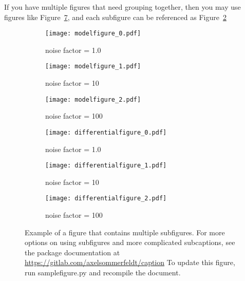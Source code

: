 \documentclass[a4paper,12pt]{article}
\begin{document}
If you have multiple figures that need grouping together, then you may use figures like Figure~\ref{fig:subcaptionfigure}, and each subfigure can be referenced as Figure~\ref{fig:1b}

\begin{figure}
	\begin{subfigure}[b]{.33\textwidth}
		\centering\texttt{[image: modelfigure\_0.pdf]}
		\caption{noise factor = 1.0}\label{fig:1a}
	\end{subfigure}\hfill
	\begin{subfigure}[b]{.33\textwidth}
		\centering\texttt{[image: modelfigure\_1.pdf]}
		\caption{noise factor = 10}\label{fig:1b}
	\end{subfigure}\hfill
	\begin{subfigure}[b]{.33\textwidth}
		\centering\texttt{[image: modelfigure\_2.pdf]}
		\caption{noise factor = 100}\label{fig:1c}
	\end{subfigure}\hfill
	\begin{subfigure}[b]{.33\textwidth}
		\centering\texttt{[image: differentialfigure\_0.pdf]}
		\caption{noise factor = 1.0}\label{fig:1d}
	\end{subfigure}\hfill
	\begin{subfigure}[b]{.33\textwidth}
		\centering\texttt{[image: differentialfigure\_1.pdf]}
		\caption{noise factor = 10}\label{fig:1e}
	\end{subfigure}\hfill
	\begin{subfigure}[b]{.33\textwidth}
		\centering\texttt{[image: differentialfigure\_2.pdf]}
		\caption{noise factor = 100}\label{fig:1f}
	\end{subfigure}
	\caption[Short caption which will be in the table of figures]{Example of a figure that contains multiple subfigures.  For more options on using subfigures and more complicated subcaptions, see the package documentation at \url{https://gitlab.com/axelsommerfeldt/caption} To update this figure, run samplefigure.py and recompile the document.}
	\label{fig:subcaptionfigure}
\end{figure}
\end{document}
